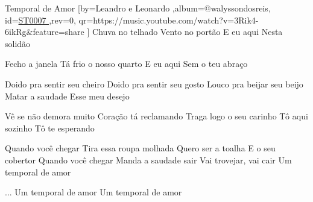 \beginsong
{Temporal de Amor %
}[by={Leandro e Leonardo %
},album={@walyssondosreis},
id={\href{https://music.youtube.com/watch?v=3Rik4-6ikRg&feature=share %
}{ST0007 %
}},rev={0}, %
qr={https://music.youtube.com/watch?v=3Rik4-6ikRg&feature=share %
}]
\beginverse
Chuva no telhado
Vento no portão
E eu aqui
Nesta solidão
\endverse

\beginverse
Fecho a janela
Tá frio o nosso quarto
E eu aqui
Sem o teu abraço
\endverse

\beginverse
Doido pra sentir seu cheiro
Doido pra sentir seu gosto
Louco pra beijar seu beijo
Matar a saudade
Esse meu desejo
\endverse

\beginverse
Vê se não demora muito
Coração tá reclamando
Traga logo o seu carinho
Tô aqui sozinho
Tô te esperando
\endverse

\beginchorus
Quando você chegar
Tira essa roupa molhada
Quero ser a toalha
E o seu cobertor
Quando você chegar
Manda a saudade sair
Vai trovejar, vai cair
Um temporal de amor
\endchorus

\beginverse
...
Um temporal de amor
Um temporal de amor
\endverse

